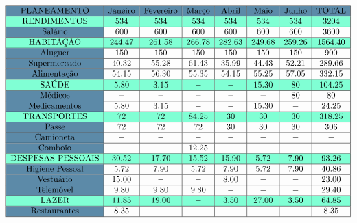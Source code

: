 \documentclass[11pt]{report}
\begin{document}
\begin{table} [h]
$$\begin{array}{|>{\columncolor{airforceblue}}c|c|c|c|c|c|c|c|} \hline
\rowcolor{airforceblue} \text{PLANEAMENTO} & \text{Janeiro} & \text{Fevereiro} & \text{Março} & \text{Abril} & \text{Maio} & \text{Junho} & \text{TOTAL} \\ \hline
\rowcolor{aquamarine} \text{RENDIMENTOS} & 534 & 534 & 534 & 534 & 534 & 534 & 3204 \\ \hline
\text{Salário} & 600 & 600 & 600 & 600 & 600 & 600 & 3600 \\ \hline
\rowcolor{aquamarine} \text{HABITAÇÃO} & 244.47 & 261.58 & 266.78 & 282.63 & 249.68 & 259.26 & 1564.40 \\ \hline
\text{Aluguer} & 150 & 150 & 150 & 150 & 150 & 150 & 900 \\ \hline
\text{Supermercado} & 40.32 & 55.28 & 61.43 & 35.99 & 44.43 & 52.21 & 289.66 \\ \hline
\text{Alimentação} & 54.15 & 56.30 & 55.35 & 54.15 & 55.25 & 57.05 & 332.15 \\ \hline
\rowcolor{aquamarine} \text{SAÚDE} & 5.80 & 3.15 & - & - & 15.30 & 80 & 104.25 \\ \hline
\text{Médicos} & - & - & - & - & - & 80 & 80 \\ \hline
\text{Medicamentos} & 5.80 & 3.15 & - & - & 15.30 & - & 24.25 \\ \hline
\rowcolor{aquamarine} \text{TRANSPORTES} & 72 & 72 & 84.25 & 30 & 30 & 30 & 318.25 \\ \hline
\text{Passe} & 72 & 72 & 72 & 30 & 30 & 30 & 306 \\ \hline
\text{Camioneta} & - & - & - & - & - & - & - \\ \hline
\text{Comboio} & - & - & 12.25 & - & - & - & - \\ \hline
\rowcolor{aquamarine} \text{DESPESAS PESSOAIS} & 30.52 & 17.70 & 15.52 & 15.90 & 5.72 & 7.90 & 93.26 \\ \hline
\text{Higiene Pessoal} & 5.72 & 7.90 & 5.72 & 7.90 & 5.72 & 7.90 & 40.86 \\ \hline
\text{Vestuário} & 15.00 & - & - & 8.00 & - & - & 23.00 \\ \hline
\text{Telemóvel} & 9.80 & 9.80 & 9.80 & - & - & - & 29.40 \\ \hline
\rowcolor{aquamarine} \text{LAZER} & 11.85 & 19.00 & - & 3.50 & 27.00 & 3.50 & 64.85 \\ \hline
\text{Restaurantes} & 8.35 & - & - & - & - & - & 8.35 \\ \hline

\end{array}$$
\end{table}
\end{document}
